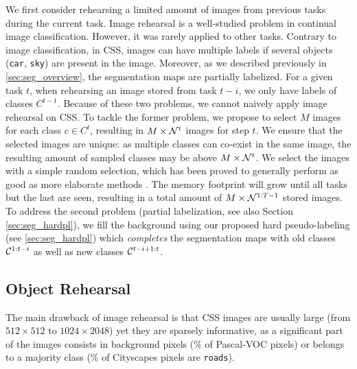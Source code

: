 We first consider rehearsing a limited amount of images from previous tasks during the current task.
Image rehearsal is a well-studied problem in continual image classification. However, it was rarely
applied to other tasks. Contrary to image classification, in \ac{CSS}, images can have multiple labels if
several objects (\eg \texttt{car}, \texttt{sky}) are present in the image. Moreover, as we
described previously in \autoref{sec:seg_overview}, the segmentation maps are partially labelized. For a
given task $t$, when rehearsing an image stored from task $t-i$, we only have labels of classes
$C^{t-1}$. Because of these two problems, we cannot naively apply image rehearsal on \ac{CSS}. To tackle
the former problem, we propose to select $M$ images for each class $c \in C^t$, resulting in $M
    \times \mathcal{N}^t$ images for step $t$. We ensure that the selected images are unique: as multiple
classes can co-exist in the same image, the resulting amount of sampled classes may be above $M
    \times \mathcal{N}^t$. We select the images with a simple random selection, which has been proved to
generally perform as good as more elaborate methods \citep{castro2018end_to_end_inc_learn}. The
memory footprint will grow until all tasks but the last are seen, resulting in a total amount of $M
    \times \mathcal{N}^{1:T-1}$ stored images. To address the second problem (partial labelization, see also
Section \ref{sec:seg_hardpl}), we fill the background using our proposed hard pseudo-labeling (see
\autoref{sec:seg_hardpl}) which \textit{completes} the segmentation maps with old classes
$\mathcal{C}^{1:t-i}$ as well as new classes $\mathcal{C}^{t-i+1:t}$.

\subsection{Object Rehearsal}
\label{sec:seg_object_rehearsal}

The main drawback of image rehearsal is that \ac{CSS} images are usually large (from $512\times 512$ to
$1024 \times 2048$) yet they are sparsely informative, as a significant part of the images consists
in background pixels \citep{lin2017focalloss} (\% of Pascal-VOC \citep{everingham2015pascalvoc}
pixels) or belongs to a majority class (\% of Cityscapes \citep{cordts2016cityscapes} pixels
are \texttt{roads}).

